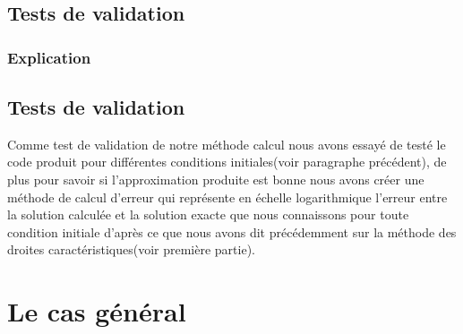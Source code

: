 \documentclass[12pt]{article}
\begin{document}
\subsection{Tests de validation}
\subsubsection{Explication}
\subsection{Tests de validation}

Comme test de validation de notre méthode calcul nous avons essayé de testé le code produit pour différentes conditions initiales(voir paragraphe précédent), de plus pour savoir si l'approximation produite est bonne nous avons créer une méthode de calcul d'erreur qui représente en échelle logarithmique l'erreur entre la solution calculée et la solution exacte que nous connaissons pour toute condition initiale d'après ce que nous avons dit précédemment sur la méthode des droites caractéristiques(voir première partie).

\section{Le cas général}
\end{document}
